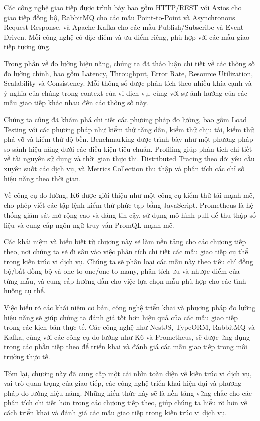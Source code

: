 Các công nghệ giao tiếp được trình bày bao gồm HTTP/REST với Axios cho giao tiếp đồng bộ, RabbitMQ cho các mẫu Point-to-Point và Asynchronous Request-Response, và Apache Kafka cho các mẫu Publish/Subscribe và Event-Driven. Mỗi công nghệ có đặc điểm và ưu điểm riêng, phù hợp với các mẫu giao tiếp tương ứng.

Trong phần về đo lường hiệu năng, chúng ta đã thảo luận chi tiết về các thông số đo lường chính, bao gồm Latency, Throughput, Error Rate, Resource Utilization, Scalability và Consistency. Mỗi thông số được phân tích theo nhiều khía cạnh và ý nghĩa của chúng trong context của vi dịch vụ, cùng với sự ảnh hưởng của các mẫu giao tiếp khác nhau đến các thông số này.

Chúng ta cũng đã khám phá chi tiết các phương pháp đo lường, bao gồm Load Testing với các phương pháp như kiểm thử tăng dần, kiểm thử chịu tải, kiểm thử phá vỡ và kiểm thử độ bền. Benchmarking được trình bày như một phương pháp so sánh hiệu năng dưới các điều kiện tiêu chuẩn. Profiling giúp phân tích chi tiết về tài nguyên sử dụng và thời gian thực thi. Distributed Tracing theo dõi yêu cầu xuyên suốt các dịch vụ, và Metrics Collection thu thập và phân tích các chỉ số hiệu năng theo thời gian.

Về công cụ đo lường, K6 được giới thiệu như một công cụ kiểm thử tải mạnh mẽ, cho phép viết các tập lệnh kiểm thử phức tạp bằng JavaScript. Prometheus là hệ thống giám sát mở rộng cao và đáng tin cậy, sử dụng mô hình pull để thu thập số liệu và cung cấp ngôn ngữ truy vấn PromQL mạnh mẽ.

Các khái niệm và hiểu biết từ chương này sẽ làm nền tảng cho các chương tiếp theo, nơi chúng ta sẽ đi sâu vào việc phân tích chi tiết các mẫu giao tiếp cụ thể trong kiến trúc vi dịch vụ. Chúng ta sẽ phân loại các mẫu này theo tiêu chí đồng bộ/bất đồng bộ và one-to-one/one-to-many, phân tích ưu và nhược điểm của từng mẫu, và cung cấp hướng dẫn cho việc lựa chọn mẫu phù hợp cho các tình huống cụ thể.

Việc hiểu rõ các khái niệm cơ bản, công nghệ triển khai và phương pháp đo lường hiệu năng sẽ giúp chúng ta đánh giá tốt hơn hiệu quả của các mẫu giao tiếp trong các kịch bản thực tế. Các công nghệ như NestJS, TypeORM, RabbitMQ và Kafka, cùng với các công cụ đo lường như K6 và Prometheus, sẽ được ứng dụng trong các phần tiếp theo để triển khai và đánh giá các mẫu giao tiếp trong môi trường thực tế.

Tóm lại, chương này đã cung cấp một cái nhìn toàn diện về kiến trúc vi dịch vụ, vai trò quan trọng của giao tiếp, các công nghệ triển khai hiện đại và phương pháp đo lường hiệu năng. Những kiến thức này sẽ là nền tảng vững chắc cho các phân tích chi tiết hơn trong các chương tiếp theo, giúp chúng ta hiểu rõ hơn về cách triển khai và đánh giá các mẫu giao tiếp trong kiến trúc vi dịch vụ.